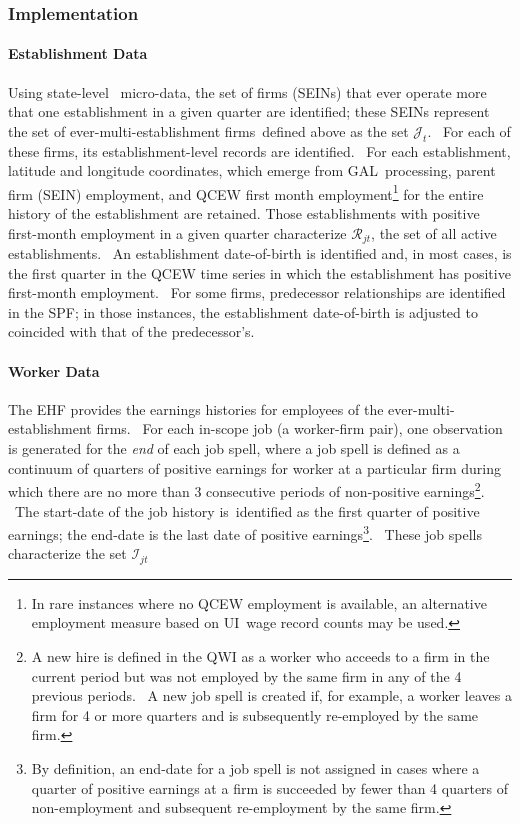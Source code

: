 \subsubsection{Implementation}

\paragraph{Establishment Data}

 Using state-level \ micro-data, the set of firms (SEINs) that ever
operate more that one establishment in a given quarter are identified; these
SEINs represent the set of ever-multi-establishment firms\ defined above as
the set $\mathcal{J}_{t}$. \ For each of these firms, its
establishment-level records are identified. \ For each establishment,
latitude and longitude coordinates, which emerge from GAL\ processing,
parent firm (SEIN) employment, and QCEW first month employment\footnote{%
In rare instances where no QCEW employment is available, an alternative
employment measure based on UI\ wage record counts may be used.} for the
entire history of the establishment are retained. Those establishments with
positive first-month employment in a given quarter characterize $\mathcal{R}%
_{jt}$, the set of all active establishments. \ An establishment
date-of-birth is identified and, in most cases, is the first quarter in the
QCEW time series in which the establishment has positive first-month
employment. \ For some firms, predecessor relationships are identified in
the SPF; in those instances, the establishment date-of-birth is adjusted to
coincided with that of the predecessor's.

\paragraph{Worker Data}

 The EHF provides the earnings histories for employees of the
ever-multi-establishment firms. \ For each in-scope job (a worker-firm
pair), one observation is generated for the \textit{end} of each job spell,
where a job spell is defined as a continuum of quarters of positive earnings
for worker at a particular firm during which there are no more than 3
consecutive periods of non-positive earnings\footnote{%
A new hire is defined in the QWI as a worker who acceeds to a firm in the
current period but was not employed by the same firm in any of the 4
previous periods. \ A new job spell is created if, for example, a worker
leaves a firm for 4 or more quarters and is subsequently re-employed by the
same firm.}. \ The start-date of the job history is\ identified as the first
quarter of positive earnings; the end-date is the last date of positive
earnings\footnote{%
By definition, an end-date for a job spell is not assigned in cases where a
quarter of positive earnings at a firm is succeeded by fewer than 4 quarters
of non-employment and subsequent re-employment by the same firm.}. \ These
job spells characterize the set $\mathcal{I}_{jt}$

